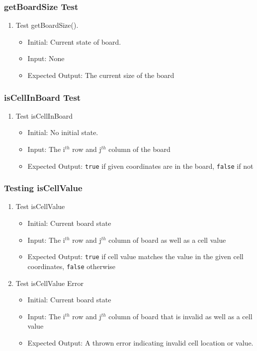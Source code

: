 \documentclass[12pt, titlepage]{article}
\begin{document}
\subsubsection {getBoardSize Test}
\begin{enumerate}
	\item Test getBoardSize(). \begin{itemize}
		      \item Initial: Current state of board.
		      \item Input: None
		      \item Expected Output: The current size of the board
	      \end{itemize}
\end{enumerate}

\subsubsection {isCellInBoard Test}
\begin{enumerate}
	\item Test isCellInBoard \begin{itemize}
		      \item Initial: No initial state.
		      \item Input: The i$^{th}$ row and j$^{th}$ column of the board
		      \item Expected Output: \texttt{true} if given coordinates are in the board, \texttt{false} if not
	      \end{itemize}
\end{enumerate}

\subsubsection {Testing isCellValue}
\begin{enumerate}
	\item Test isCellValue \begin{itemize}
		      \item Initial: Current board state
		      \item Input: The i$^{th}$ row and j$^{th}$ column of board as well as a cell value
		      \item Expected Output: \texttt{true} if cell value matches the value in the given cell coordinates, \texttt{false} otherwise
	      \end{itemize}
	\item Test isCellValue Error \begin{itemize}
		      \item Initial: Current board state
		      \item Input: The i$^{th}$ row and j$^{th}$ column of board that is invalid as well as a cell value
		      \item Expected Output: A thrown error indicating invalid cell location or value.
	      \end{itemize}
\end{enumerate}
\end{document}
